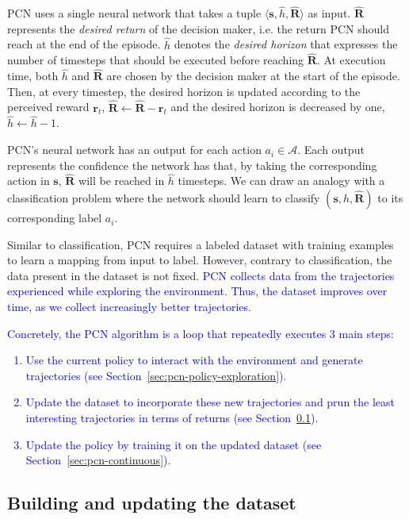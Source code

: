 \documentclass{article}
\newcommand\added[1]{\textcolor{blue}{#1}}
\newcommand{\mdpstate}{\mathbf{s}}
\newcommand{\momdpreward}{\mathbf{r}}
\newcommand{\action}{a}
\begin{document}
PCN uses a single neural network that takes a tuple $\langle \mdpstate, \hat{h}, \mathbf{\hat{R}}  \rangle$ as input. $\mathbf{\hat{R}}$ represents the \emph{desired return} of the decision maker, i.e. the return PCN should reach at the end of the episode. $\hat{h}$ denotes the \emph{desired horizon} that expresses the number of timesteps that should be executed before reaching $\mathbf{\hat{R}}$. At execution time, both $\hat{h}$ and $\mathbf{\hat{R}}$ are chosen by the decision maker at the start of the episode. Then, at every timestep, the desired horizon is updated according to the perceived reward $\momdpreward_t$, $\mathbf{\hat{R}} \leftarrow \mathbf{\hat{R}} - \momdpreward_t$ and the desired horizon is decreased by one, $\hat{h} \leftarrow \hat{h}-1$.

PCN's neural network has an output for each action $\action_i \in \mathcal{A}$. Each output represents the confidence the network has that, by taking the corresponding action in $\mdpstate$, $\mathbf{\hat{R}}$ will be reached in $\hat{h}$ timesteps. We can draw an analogy with a classification problem where the network should learn to classify $(\mdpstate, \hat{h}, \mathbf{\hat{R}})$ to its corresponding label $\action_i$.

Similar to classification, PCN requires a labeled dataset with training examples to learn a mapping from input to label. However, contrary to classification, the data present in the dataset is not fixed. \added{PCN collects data from the trajectories experienced while exploring the environment. Thus, the dataset improves over time, as we collect increasingly better trajectories.}

\added{Concretely, the PCN algorithm is a loop that repeatedly executes 3 main steps:
\begin{enumerate}
    \item Use the current policy to interact with the environment and generate trajectories (see Section~\ref{sec:pcn-policy-exploration}).
    \item Update the dataset to incorporate these new trajectories and prun the least interesting trajectories in terms of returns (see Section~\ref{sec:pcn-building-dataset}).
    \item Update the policy by training it on the updated dataset (see Section~\ref{sec:pcn-continuous}).
\end{enumerate}
}

\subsection{Building and updating the dataset}
\label{sec:pcn-building-dataset}
\end{document}
